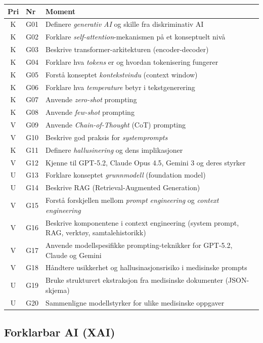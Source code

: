\documentclass[11pt,a4paper]{article}
\begin{document}
\begin{longtable}{@{}clp{9cm}@{}}
\toprule
\textbf{Pri} & \textbf{Nr} & \textbf{Moment} \\
\midrule
\endfirsthead
\midrule
\endhead
\midrule
\endfoot
\bottomrule
\endlastfoot
K & G01 & Definere \emph{generativ AI} og skille fra diskriminativ AI \\
K & G02 & Forklare \emph{self-attention}-mekanismen på et konseptuelt nivå \\
K & G03 & Beskrive transformer-arkitekturen (encoder-decoder) \\
K & G04 & Forklare hva \emph{tokens} er og hvordan tokenisering fungerer \\
K & G05 & Forstå konseptet \emph{kontekstvindu} (context window) \\
K & G06 & Forklare hva \emph{temperature} betyr i tekstgenerering \\
K & G07 & Anvende \emph{zero-shot} prompting \\
K & G08 & Anvende \emph{few-shot} prompting \\
V & G09 & Anvende \emph{Chain-of-Thought} (CoT) prompting \\
V & G10 & Beskrive god praksis for \emph{systemprompts} \\
K & G11 & Definere \emph{hallusinering} og dens implikasjoner \\
V & G12 & Kjenne til GPT-5.2, Claude Opus 4.5, Gemini 3 og deres styrker \\
U & G13 & Forklare konseptet \emph{grunnmodell} (foundation model) \\
U & G14 & Beskrive RAG (Retrieval-Augmented Generation) \\
V & G15 & Forstå forskjellen mellom \emph{prompt engineering} og \emph{context engineering} \\
V & G16 & Beskrive komponentene i context engineering (system prompt, RAG, verktøy, samtalehistorikk) \\
V & G17 & Anvende modellspesifikke prompting-teknikker for GPT-5.2, Claude og Gemini \\
V & G18 & Håndtere usikkerhet og hallusinasjonsrisiko i medisinske prompts \\
U & G19 & Bruke strukturert ekstraksjon fra medisinske dokumenter (JSON-skjema) \\
U & G20 & Sammenligne modellstyrker for ulike medisinske oppgaver \\
\end{longtable}

\subsection{Forklarbar AI (XAI)}
\end{document}
